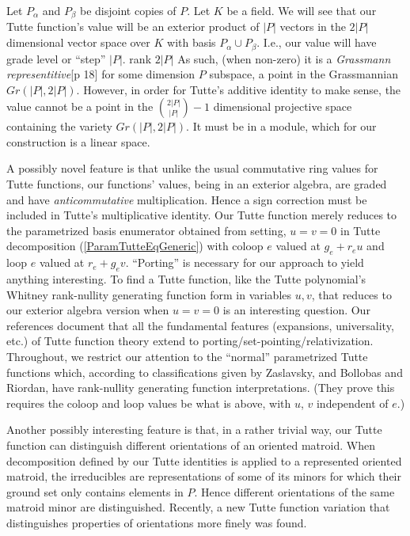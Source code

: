 \documentclass[Unicode]{cedram-alco}
\begin{document}
Let $P_{\alpha}$ and $P_{\beta}$ be disjoint copies of $P$.  Let $K$ be a field.
We will see that our Tutte function's value will be an exterior product of
$|P|$ vectors in the $2|P|$ dimensional vector space over $K$ with basis $P_\alpha \cup P_\beta$.
I.e., our value will
have grade level or ``step''  $|P|$.
rank $2|P|$
As such, (when non-zero)
it is a \emph{Grassmann representitive}\cite{MarcusFDMuAlPt2}[p 18]
for some
dimension $P$ subspace, a point in the Grassmannian $Gr(|P|,2|P|)$.
However, in order for Tutte's additive identity to make sense, the value cannot be
a point in the $\binom{2|P|}{|P|}-1$ dimensional projective space
containing the variety $Gr(|P|,2|P|)$.  It must be in a module, which for
our construction is a linear space.

A possibly novel feature is that unlike the usual commutative ring values for Tutte
functions, our functions' values, being in an exterior algebra, are graded and have
\emph{anticommutative} multiplication.
Hence a sign correction must be included in Tutte's multiplicative
identity.  Our Tutte function merely reduces to the parametrized
basis enumerator obtained from setting, $u=v=0$ in Tutte
decomposition (\ref{ParamTutteEqGeneric})
with coloop $e$ valued at $g_e+r_eu$ and loop $e$ valued at $r_e+g_ev$.
``Porting'' is necessary for our approach to yield anything
interesting. To find a Tutte function,
like the Tutte polynomial's Whitney rank-nullity
generating function form in variables $u,v$, that reduces to our exterior
algebra version when $u=v=0$ is an interesting question.
Our
references\cite{MR0419272,SetPointedLV,sdcPorted,TutteEx,RelTuttePolyDiaoHetyei}
document that all the fundamental features
(expansions, universality, etc.)
of Tutte function theory extend to porting/set-pointing/relativization.  Throughout,
we restrict our attention to the ``normal'' parametrized Tutte functions which, according
to classifications given by Zaslavsky\cite{MR93a:05047},
and Bollobas and Riordan\cite{BollobasRiordanTuttePolyColored},
have rank-nullity generating function interpretations.
(They prove this requires the
coloop and loop values be what is above, with $u$, $v$ independent of $e$.)

Another possibly interesting feature is that, in a rather trivial way,
our Tutte function can distinguish different orientations of an oriented
matroid.  When decomposition defined by our Tutte identities is applied to
a represented oriented matroid, the irreducibles are representations of
some of its minors for which their ground set only contains elements in $P$.
Hence different orientations of the same matroid minor are distinguished.  Recently,
a new Tutte function variation that distinguishes properties of orientations
more finely was found\cite{AwanBernardiOMTuttePre}.
\end{document}

